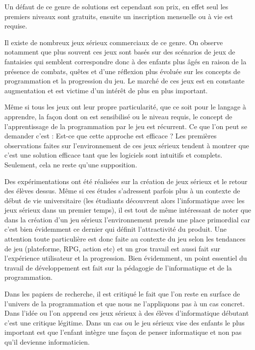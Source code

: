 Un défaut de ce genre de solutions est cependant son prix, en effet seul les premiers niveaux sont gratuits, ensuite un inscription mensuelle ou à vie est requise.

Il existe de nombreux jeux sérieux commerciaux de ce genre. On observe notamment que plus souvent ces jeux sont basés sur des scénarios de jeux de fantaisies qui semblent correspondre donc à des enfants plus âgés en raison de la présence de combats, quêtes et d'une réflexion plus évoluée sur les concepts de programmation et la progression du jeu. Le marché de ces jeux est en constante augmentation et est victime d'un intérêt de plus en plus important. \cite{40} 

Même si tous les jeux ont leur propre particularité, que ce soit pour le langage à apprendre, la façon dont on est sensibilisé ou le niveau requis, le concept de l'apprentissage de la programmation par le jeu est récurrent. Ce que l'on peut se demander c'est : Est-ce que cette approche est efficace ? Les premières observations faites sur l'environnement de ces jeux sérieux tendent à montrer que c'est une solution efficace tant que les logiciels sont intuitifs et complets. Seulement, cela ne reste qu'une supposition.

\newpage

Des expérimentations ont été réalisées sur la création de jeux sérieux et le retour des élèves dessus. \cite{41} \cite{42} \cite{43} Même si ces études s'adressent parfois plus à un contexte de début de vie universitaire (les étudiants découvrent alors l'informatique avec les jeux sérieux dans un premier temps), il est tout de même intéressant de noter que dans la création d'un jeu sérieux l'environnement prends une place primordial car c'est bien évidemment ce dernier qui définit l'attractivité du produit. Une attention toute particulière est donc faite au contexte du jeu selon les tendances de jeu (plateforme, RPG, action etc) et un gros travail est aussi fait sur l'expérience utilisateur et la progression. Bien évidemment, un point essentiel du travail de développement est fait sur la pédagogie de l'informatique et de la programmation.

Dans les papiers de recherche, il est critiqué le fait que l'on reste en surface de l'univers de la programmation et que nous ne l'appliquons pas à un cas concret. Dans l'idée ou l'on apprend ces jeux sérieux à des élèves d'informatique débutant c'est une critique légitime. Dans un cas ou le jeu sérieux vise des enfants le plus important est que l'enfant intègre une façon de penser informatique et non pas qu'il devienne informaticien. 

